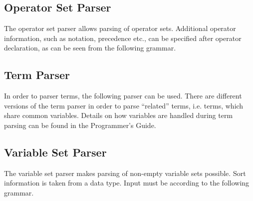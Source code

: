\subsection{Operator Set Parser}
The operator set parser allows parsing of operator sets. Additional operator
information, such as notation, precedence etc., can be specified after operator
declaration, as can be seen from the following grammar.
\begin{center}
\end{center}

\subsection{Term Parser}
In order to parser terms, the following parser can be used. There are
different versions of the term parser in order to parse ``related'' terms,
i.e. terms, which share common variables. Details on how variables
are handled during term parsing can be found in the Programmer's Guide.
\begin{center}
\end{center}

\subsection{Variable Set Parser}
The variable set parser makes parsing of non-empty variable sets possible.
Sort information is taken from a data type. Input must be according to the
following grammar.
\begin{center}
\end{center}

